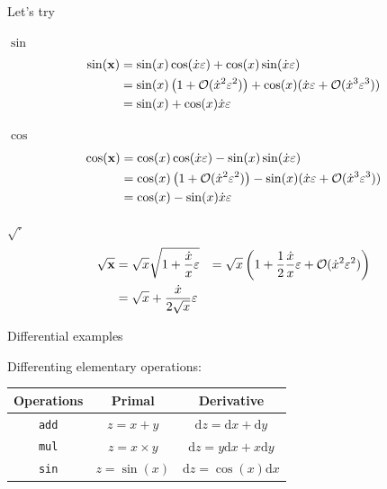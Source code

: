 \documentclass[12pt,xcolor={table}]{beamer}
\newcommand{\xbf}{{\bf x}}
\newcommand{\dif}[1]{\mathrm{d} #1}
\begin{document}
\begin{frame}{Let's try}
  \begin{block}{$\sin$}
    \vspace{-0.5cm}
    \begin{align*}
      \sin(\xbf) &= \sin(x)\cos(\dot{x}\varepsilon) + \cos(x)\sin(\dot{x}\varepsilon) \\
      &= \sin(x)\left( 1 + \mathcal{O}(\dot{x}^2\varepsilon^2) \right) + \cos(x)(\dot{x}\varepsilon + \mathcal{O}(\dot{x}^3\varepsilon^3)) \\
      &= \sin(x) + \cos(x)\dot{x}\varepsilon
    \end{align*}
  \end{block}

  \begin{block}{$\cos$}
    \vspace{-0.5cm}
    \begin{align*}
      \cos(\xbf) &= \cos(x)\cos(\dot{x}\varepsilon) - \sin(x)\sin(\dot{x}\varepsilon) \\
      &= \cos(x)\left( 1 + \mathcal{O}(\dot{x}^2\varepsilon^2) \right) - \sin(x)(\dot{x}\varepsilon + \mathcal{O}(\dot{x}^3\varepsilon^3)) \\
      &= \cos(x) - \sin(x)\dot{x}\varepsilon
    \end{align*}
  \end{block}

  \begin{block}{$\sqrt{\cdot}$}
    \vspace{-0.5cm}
    \begin{align*}
      \sqrt{\xbf} &= \sqrt{x}\sqrt{1 + \frac{\dot{x}}{x}\varepsilon}
      &= \sqrt{x}\left( 1 + \frac{1}{2}\frac{\dot{x}}{x}\varepsilon + \mathcal{O}(\dot{x}^2\varepsilon^2) \right) \\
      &= \sqrt{x} + \frac{\dot{x}}{2\sqrt{x}}\varepsilon
    \end{align*}
  \end{block}
\end{frame}

\begin{frame}{Differential examples}

Differenting elementary operations:

\begin{center}
\begin{tabular}{c|c|c}
Operations & Primal & Derivative \\
\hline
\texttt{add} & $z = x + y$ & $\dif{z} = \dif{x} + \dif{y}$ \\
\texttt{mul} & $z = x \times y$ & $\dif{z} = y\dif{x} + x\dif{y}$ \\
\texttt{sin} & $z = \sin(x)$ & $\dif{z} = \cos(x)\dif{x}$
\end{tabular}
\end{center}

\end{frame}
\end{document}
